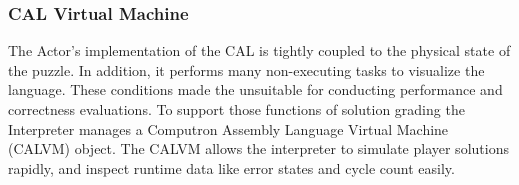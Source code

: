 \subsubsection{CAL Virtual Machine}
The Actor's implementation of the CAL is tightly coupled to the physical state of the puzzle. In addition,
it performs many non-executing tasks to visualize the language. These conditions made the unsuitable for 
conducting performance and correctness evaluations. To support those functions of solution grading the Interpreter
manages a Computron Assembly Language Virtual Machine (CALVM) object. The CALVM allows the interpreter to simulate
player solutions rapidly, and inspect runtime data like error states and cycle count easily. 